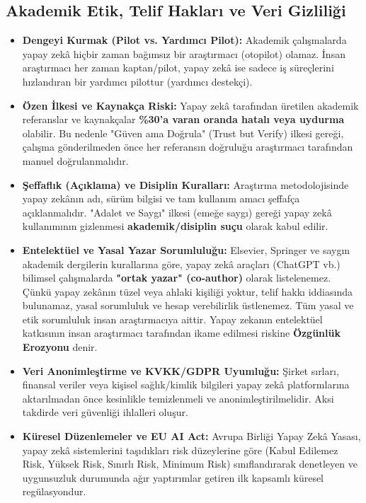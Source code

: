\documentclass[11pt,a4paper,openany]{book}
\begin{document}
\needspace{9cm}
\subsection{Akademik Etik, Telif Hakları ve Veri Gizliliği}
\begin{itemize}
    \item \textbf{Dengeyi Kurmak (Pilot vs. Yardımcı Pilot):} Akademik çalışmalarda yapay zekâ hiçbir zaman bağımsız bir araştırmacı (otopilot) olamaz. İnsan araştırmacı her zaman kaptan/pilot, yapay zekâ ise sadece iş süreçlerini hızlandıran bir yardımcı pilottur (yardımcı destekçi).
    \item \textbf{Özen İlkesi ve Kaynakça Riski:} Yapay zekâ tarafından üretilen akademik referanslar ve kaynakçalar \textbf{\%30'a varan oranda hatalı veya uydurma} olabilir. Bu nedenle "Güven ama Doğrula" (Trust but Verify) ilkesi gereği, çalışma gönderilmeden önce her referansın doğruluğu araştırmacı tarafından manuel doğrulanmalıdır.
    \item \textbf{Şeffaflık (Açıklama) ve Disiplin Kuralları:} Araştırma metodolojisinde yapay zekânın adı, sürüm bilgisi ve tam kullanım amacı şeffafça açıklanmalıdır. "Adalet ve Saygı" ilkesi (emeğe saygı) gereği yapay zekâ kullanımının gizlenmesi \textbf{akademik/disiplin suçu} olarak kabul edilir.
    \item \textbf{Entelektüel ve Yasal Yazar Sorumluluğu:} Elsevier, Springer ve saygın akademik dergilerin kurallarına göre, yapay zekâ araçları (ChatGPT vb.) bilimsel çalışmalarda \textbf{"ortak yazar" (co-author)} olarak listelenemez. Çünkü yapay zekânın tüzel veya ahlaki kişiliği yoktur, telif hakkı iddiasında bulunamaz, yasal sorumluluk ve hesap verebilirlik üstlenemez. Tüm yasal ve etik sorumluluk insan araştırmacıya aittir. Yapay zekanın entelektüel katkısının insan araştırmacı tarafından ikame edilmesi riskine \textbf{Özgünlük Erozyonu} denir.
    \item \textbf{Veri Anonimleştirme ve KVKK/GDPR Uyumluğu:} Şirket sırları, finansal veriler veya kişisel sağlık/kimlik bilgileri yapay zekâ platformlarına aktarılmadan önce kesinlikle temizlenmeli ve anonimleştirilmelidir. Aksi takdirde veri güvenliği ihlalleri oluşur.
    \item \textbf{Küresel Düzenlemeler ve EU AI Act:} Avrupa Birliği Yapay Zekâ Yasası, yapay zekâ sistemlerini taşıdıkları risk düzeylerine göre (Kabul Edilemez Risk, Yüksek Risk, Sınırlı Risk, Minimum Risk) sınıflandırarak denetleyen ve uygunsuzluk durumunda ağır yaptırımlar getiren ilk kapsamlı küresel regülasyondur.
\end{itemize}
\end{document}
